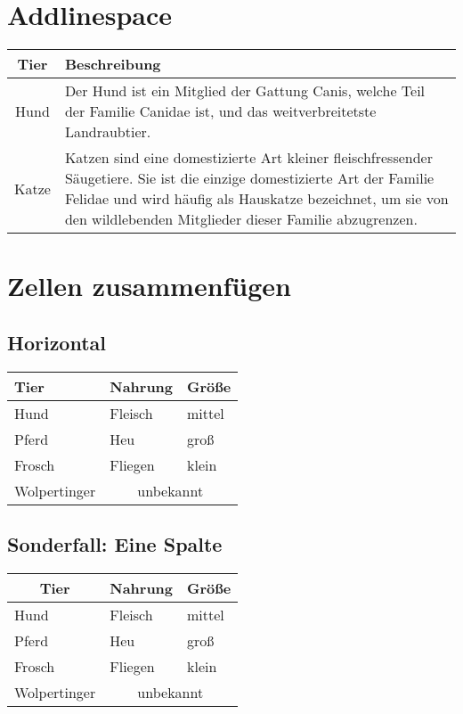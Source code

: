 \documentclass[a4paper]{article}
\begin{document}
\section{Addlinespace}

\begin{tabular}{cp{9cm}}
    \toprule
    Tier  & Beschreibung                                                         \\
    \midrule
    Hund  & Der Hund ist ein Mitglied der Gattung Canis, welche Teil der Familie
    Canidae ist, und das weitverbreitetste Landraubtier.                         \\
    \addlinespace
    Katze & Katzen sind eine domestizierte Art kleiner fleischfressender
    Säugetiere. Sie ist die einzige domestizierte Art der Familie Felidae
    und wird häufig als Hauskatze bezeichnet, um sie von den wildlebenden
    Mitglieder dieser Familie abzugrenzen.                                       \\
    \bottomrule
\end{tabular}

\section{Zellen zusammenfügen}

\subsection{Horizontal}

\begin{tabular}{lll}
    \toprule
    Tier         & Nahrung                       & Größe  \\
    \midrule
    Hund         & Fleisch                       & mittel \\
    Pferd        & Heu                           & groß   \\
    Frosch       & Fliegen                       & klein  \\
    Wolpertinger & \multicolumn{2}{c}{unbekannt}          \\
    \bottomrule
\end{tabular}

\subsection{Sonderfall: Eine Spalte}

\begin{tabular}{lll}
    \toprule
    \multicolumn{1}{c}{Tier} & \multicolumn{1}{c}{Nahrung}   & \multicolumn{1}{c}{Größe} \\
    \midrule
    Hund                     & Fleisch                       & mittel                    \\
    Pferd                    & Heu                           & groß                      \\
    Frosch                   & Fliegen                       & klein                     \\
    Wolpertinger             & \multicolumn{2}{c}{unbekannt}                             \\
    \bottomrule
\end{tabular}
\end{document}
